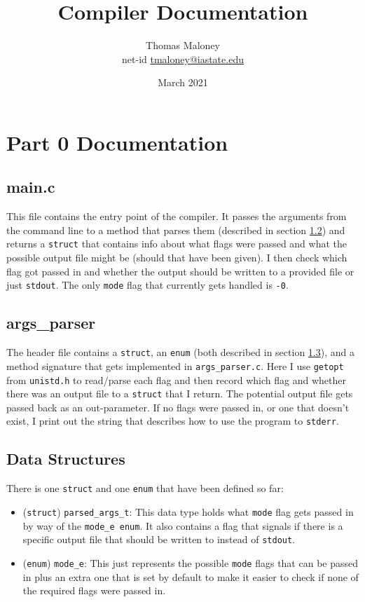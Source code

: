 \documentclass{article}
\title{Compiler Documentation}
\author{Thomas Maloney \\ 
net-id \href{mailto:tmaloney@iastate.edu}{tmaloney@iastate.edu}}
\date{March 2021}
\begin{document}
\maketitle

\newcommand{\code}[1]{\texttt{#1}}

\section{Part 0 Documentation}
\subsection{main.c} 
\label{ssec:p0main}
This file contains the entry point of the compiler.
It passes the arguments from the command line to a method that parses them (described in section \ref{ssec:p0argparser}) and returns a \code{struct} that contains info about what flags were passed and what the possible output file might be (should that have been given).
I then check which flag got passed in and whether the output should be written to a provided file or just \code{stdout}.
The only \code{mode} flag that currently gets handled is \code{-0}.

\subsection{args\_parser} 
\label{ssec:p0argparser}
The header file contains a \code{struct}, an \code{enum} (both described in section \ref{ssec:p0datastructs}), and a method signature that gets implemented in \code{args\_parser.c}.
Here I use \code{getopt} from \code{unistd.h} to read/parse each flag and then record which flag and whether there was an output file to a \code{struct} that I return.
The potential output file gets passed back as an out-parameter.
If no flags were passed in, or one that doesn't exist, I print out the string that describes how to use the program to \code{stderr}.

\subsection{Data Structures} 
\label{ssec:p0datastructs}
There is one \code{struct} and one \code{enum} that have been defined so far:
\begin{itemize}
    \item (\code{struct}) \code{parsed\_args\_t}: This data type holds what \code{mode} flag gets passed in by way of the \code{mode\_e enum}.
    It also contains a flag that signals if there is a specific output file that should be written to instead of \code{stdout}.
    \item (\code{enum}) \code{mode\_e}: This just represents the possible \code{mode} flags that can be passed in plus an extra one that is set by default to make it easier to check if none of the required flags were passed in.
\end{itemize}
\end{document}
